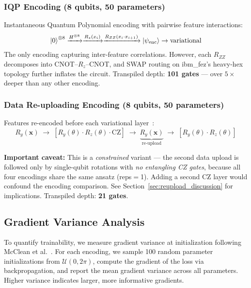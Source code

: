 \documentclass[conference,onecolumn,11pt]{IEEEtran}
\begin{document}
\subsubsection{IQP Encoding (8 qubits, 50 parameters)}
Instantaneous Quantum Polynomial encoding with pairwise feature interactions:
\begin{equation}
\ket{0}^{\otimes 8} \xrightarrow{H^{\otimes 8}} \xrightarrow{R_z(x_i)} \xrightarrow{R_{ZZ}(x_i \cdot x_{i+1})} \ket{\psi_{\mathrm{enc}}} \rightarrow \text{variational}
\end{equation}
The only encoding capturing inter-feature correlations. However, each $R_{ZZ}$ decomposes into CNOT--$R_z$--CNOT, and SWAP routing on ibm\_fez's heavy-hex topology further inflates the circuit. Transpiled depth: \textbf{101 gates} --- over $5\times$ deeper than any other encoding.

\subsubsection{Data Re-uploading Encoding (8 qubits, 50 parameters)}
Features re-encoded before each variational layer~\cite{perez2020}:
\begin{equation}
R_y(\mathbf{x}) \;\rightarrow\; [R_y(\theta) \cdot R_z(\theta) \cdot \mathrm{CZ}] \;\rightarrow\; \underbrace{R_y(\mathbf{x})}_{\text{re-upload}} \;\rightarrow\; [R_y(\theta) \cdot R_z(\theta)]
\end{equation}

\textbf{Important caveat:} This is a \emph{constrained} variant --- the second data upload is followed only by single-qubit rotations with \emph{no entangling CZ gates}, because all four encodings share the same ansatz (reps$=$1). Adding a second CZ layer would confound the encoding comparison. See Section~\ref{sec:reupload_discussion} for implications. Transpiled depth: \textbf{21 gates}.

\subsection{Gradient Variance Analysis}

To quantify trainability, we measure gradient variance at initialization following McClean et al.~\cite{mcclean2018barren}. For each encoding, we sample 100 random parameter initializations from $\mathcal{U}(0, 2\pi)$, compute the gradient of the loss via backpropagation, and report the mean gradient variance across all parameters. Higher variance indicates larger, more informative gradients.
\end{document}
